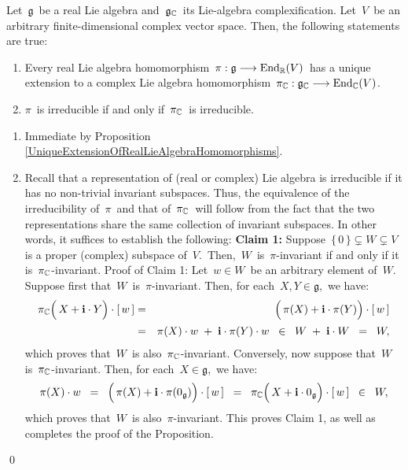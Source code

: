 
\begin{proposition}
\mbox{}
\vskip 0.05cm
\noindent
Let \,$\mathfrak{g}$\, be a real Lie algebra and
\,$\mathfrak{g}_{\mathbb{C}}$\, its Lie-algebra complexification.
Let \,$V$\, be an arbitrary finite-dimensional complex vector space.
Then, the following statements are true:
\begin{enumerate}
\item
	Every real Lie algebra homomorphism
	\,$\pi : \mathfrak{g} \longrightarrow \textnormal{End}_{\mathbb{R}}(V)$\,
	has a unique extension to a complex Lie algebra homomorphism
	\,$\pi_{\mathbb{C}} : \mathfrak{g}_{\mathbb{C}} \longrightarrow \textnormal{End}_{\mathbb{C}}(V)$.\,
\item
	$\pi$\, is irreducible if and only if \,$\pi_{\mathbb{C}}$\, is irreducible.
\end{enumerate}
\end{proposition}
\proof
\begin{enumerate}
\item
	Immediate by Proposition \ref{UniqueExtensionOfRealLieAlgebraHomomorphisms}.
\item
	Recall that a representation of (real or complex) Lie algebra is irreducible if it has
	no non-trivial invariant subspaces.
	Thus, the equivalence of the irreducibility of \,$\pi$\, and that of \,$\pi_{\mathbb{C}}$\,
	will follow from the fact that the two representations share the same collection
	of invariant subspaces. In other words, it suffices to establish the following:
	\vskip 0.2cm
	\noindent
	\textbf{Claim 1:}\quad
	Suppose \,$\{\,0\,\} \subsetneq W \subsetneq V$\, is a proper (complex) subspace of \,$V$.\,
	Then, \,$W$\, is \,$\pi$-invariant if and only if it is \,$\pi_{\mathbb{C}}$-invariant. 
	\vskip 0.1cm
	\noindent
	Proof of Claim 1:\quad
	Let \,$w \in W$\, be an arbitrary element of \,$W$.\,
	Suppose first that \,$W$\, is \,$\pi$-invariant.
	Then, for each \,$X, Y \in \mathfrak{g}$,\, we have:
	\begin{eqnarray*}
	\pi_{\C}\!\left(\,X \overset{{\color{white}.}}{+} \i\cdot Y \right) \cdot [\,w\,]
	& = &
		\left(\,\pi(X) \overset{{\color{white}.}}{+} \i\cdot \pi(Y) \right) \cdot [\,w\,]
	\\
	& = &
		\pi(X) \cdot w \;\overset{{\color{white}.}}{+}\; \i\cdot \pi(Y) \cdot w
	\;\; \in \;\;
		W \; + \; \i \cdot W
	\;\; = \;\;
		W,
	\end{eqnarray*}
	which proves that \,$W$\, is also \,$\pi_{\mathbb{C}}$-invariant.
	Conversely, now suppose that \,$W$\, is \,$\pi_{\mathbb{C}}$-invariant.
	Then, for each \,$X \in \mathfrak{g}$,\, we have:
	\begin{equation*}
	\pi(X)\cdot w
	\;\; = \;\;
		\left(\,\pi(X) \overset{{\color{white}.}}{+} \i\cdot \pi(0_{\mathfrak{g}}) \right) \cdot [\,w\,]
	\;\; = \;\;
		\pi_{\C}\!\left(\,X \overset{{\color{white}.}}{+} \i\cdot 0_{\mathfrak{g}} \right) \cdot [\,w\,]
	\;\; \in \;\;
		W,
	\end{equation*}
	which proves that \,$W$\, is also \,$\pi$-invariant.
	This proves Claim 1, as well as completes the proof of the Proposition.
\end{enumerate}
\qed

